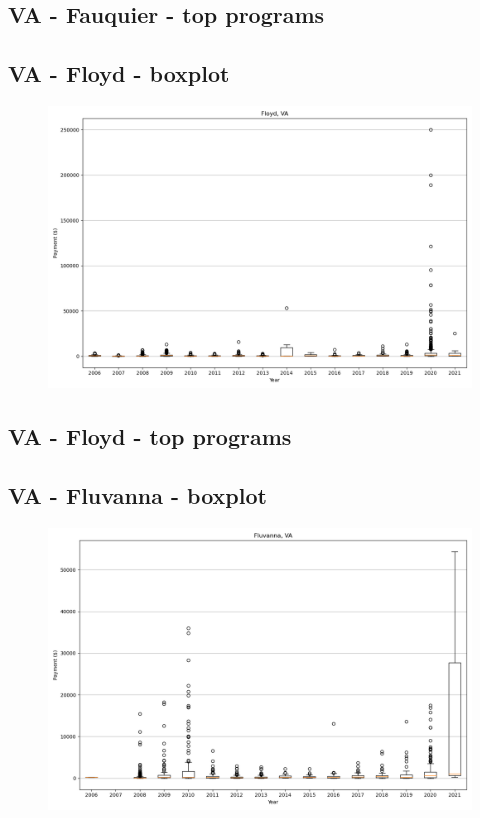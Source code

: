 \subsection*{VA - Fauquier - top programs}

\newpage
\subsection*{VA - Floyd - boxplot}
\begin{figure}[h]
\centering
\includegraphics[width=7in]{../output/boxplots/counties/Floyd-VA_boxplot.png}
\end{figure}


\subsection*{VA - Floyd - top programs}

\newpage
\subsection*{VA - Fluvanna - boxplot}
\begin{figure}[h]
\centering
\includegraphics[width=7in]{../output/boxplots/counties/Fluvanna-VA_boxplot.png}
\end{figure}


